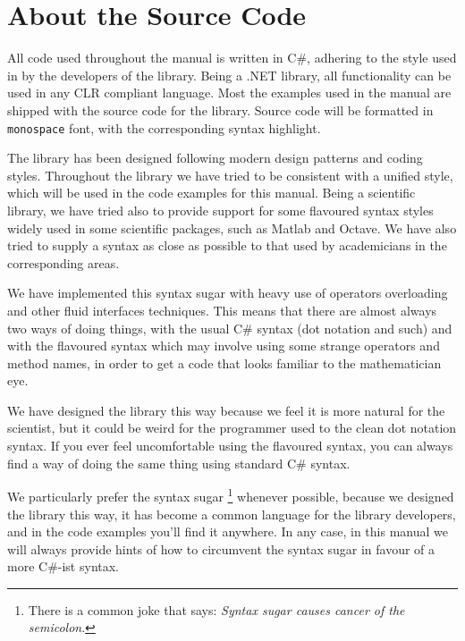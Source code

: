 \section*{About the Source Code}

All code used throughout the manual is written in C\#, adhering
to the style used in by the developers of the library. Being a 
.NET library, all functionality can be used in any CLR compliant
language. Most the examples used in the manual are shipped
with the source code for the library. 
Source code will be formatted in \verb|monospace| font, with
the corresponding syntax highlight.

The \sct library has been designed following modern
design patterns and coding styles. Throughout the library we have
tried to be consistent with a unified style, which will be used in
the code examples for this manual. Being a scientific library, we
have tried also to provide support for some flavoured syntax styles
widely used in some scientific packages, such as Matlab and Octave.
We have also tried to supply a syntax as close as possible to that
used by academicians in the corresponding areas.

We have implemented this syntax sugar with heavy use of operators
overloading and other fluid interfaces techniques. This means 
that there are almost always two ways of doing things, with
the usual C\# syntax (dot notation and such) and with the flavoured
syntax which may involve using some strange operators and 
method names, in order to get a code that looks familiar
to the mathematician eye. 

We have designed the library this way because we feel it is
more natural for the scientist, but it could be weird for the
programmer used to the clean dot notation syntax. If you ever
feel uncomfortable using the flavoured syntax, you can
always find a way of doing the same thing using standard
C\# syntax. 

We particularly prefer the syntax sugar
\footnote{There is a common joke that says: \emph{Syntax sugar
causes cancer of the semicolon}.} whenever possible, because
we designed the library this way, it has become a
common language for the library developers, and in the code examples
you'll find it anywhere. In any case, in this manual we will
always provide hints of how to circumvent the syntax sugar
in favour of a more C\#-ist syntax.

